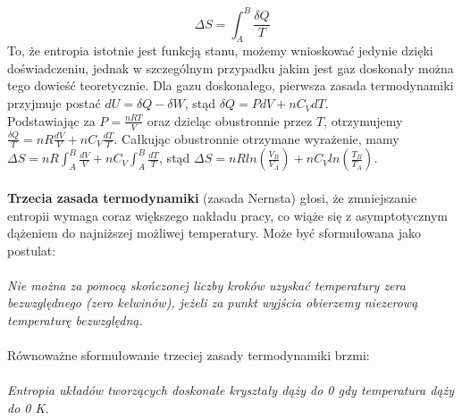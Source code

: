 \documentclass[12pt,a4paper,openright]{report} %
\begin{document}
%
\begin{equation}
\Delta S=\int_{A}^{B} \frac{\delta Q}{T}
\end{equation}
To, że entropia istotnie jest funkcją stanu, możemy wnioskować jedynie dzięki doświadczeniu, jednak w szczególnym przypadku jakim jest gaz doskonały można tego dowieść teoretycznie. Dla gazu doskonałego, pierwsza zasada termodynamiki przyjmuje postać $dU=\delta Q - \delta W$, stąd $\delta Q = PdV + nC_V dT$.\\ Podstawiając za $P=\frac{nRT}{V}$ oraz dzieląc obustronnie przez $T$, otrzymujemy \\ $\frac{\delta Q}{T}=nR \frac{dV}{V}+nC_V \frac{dT}{T}$. Całkując obustronnie otrzymane wyrażenie, mamy \\ $\Delta S=nR \int_{A}^{B} \frac{dV}{V} +nC_V \int_{A}^{B} \frac{dT}{T}$, stąd $\Delta S = nR ln \left( \frac{V_B}{V_A} \right) + nC_V ln \left( \frac{T_B}{T_A} \right)$.
%
\\
\\
\textbf{Trzecia zasada termodynamiki} (zasada Nernsta) głosi, że zmniejszanie entropii wymaga coraz większego nakładu pracy, co wiąże się z asymptotycznym dążeniem do najniższej możliwej temperatury. Może być sformułowana jako postulat: \\
\\
\textit{Nie można za pomocą skończonej liczby kroków uzyskać temperatury zera bezwzględnego (zero kelwinów), jeżeli za punkt wyjścia obierzemy niezerową temperaturę bezwzględną.}\\
\\
Równoważne sformułowanie trzeciej zasady termodynamiki brzmi: \\
\\
\textit{Entropia układów tworzących doskonałe kryształy dąży do 0 gdy temperatura dąży do 0 K.}
\\
\end{document}
